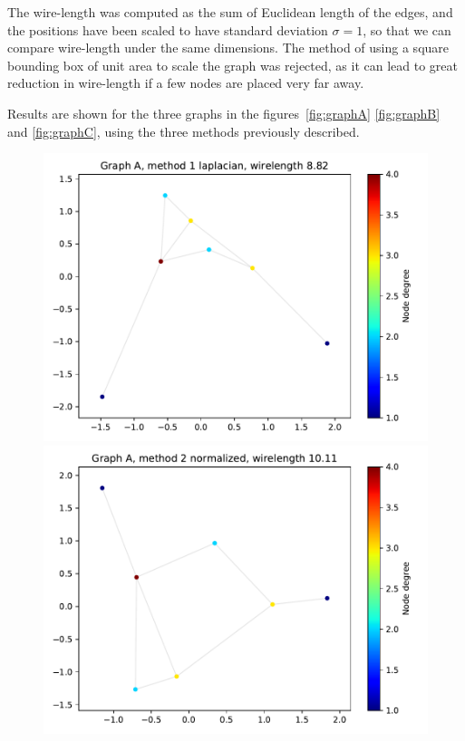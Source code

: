 \documentclass[a4paper,twocolumn]{article}
\begin{document}
The wire-length was computed as the sum of Euclidean length of the edges, and 
the positions have been scaled to have standard deviation $\sigma = 1$, so that 
we can compare wire-length under the same dimensions.
%
The method of using a square bounding box of unit area to scale the graph was 
rejected, as it can lead to great reduction in wire-length if a few nodes are 
placed very far away.

Results are shown for the three graphs in the figures~\ref{fig:graphA} 
\ref{fig:graphB} and \ref{fig:graphC}, using the three methods previously 
described.

\begin{figure}[h]
	\centering
	\includegraphics[width=\columnwidth]{fig/A/laplacian.pdf}
	\includegraphics[width=\columnwidth]{fig/A/norm.pdf}

\end{figure}
\end{document}
